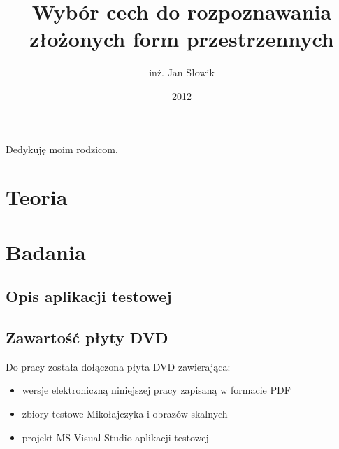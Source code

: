 \documentclass[oneside]{mgr}
\title{Wybór cech do rozpoznawania \\złożonych form przestrzennych}
\author{inż. Jan Słowik}
\date{2012}
\begin{document}
 
\maketitle 
\dedication{6cm}{Dedykuję moim rodzicom.}
\tableofcontents 


\part{Teoria}

\part{Badania}





\appendix
\chapter{Opis aplikacji testowej}
\chapter{Zawartość płyty DVD}
Do pracy została dołączona płyta DVD zawierająca:
\begin{itemize}
\item wersje elektroniczną niniejszej pracy zapisaną w formacie PDF
\item zbiory testowe Mikołajczyka i obrazów skalnych
\item projekt MS Visual Studio aplikacji testowej
\end{itemize}






 \listoffigures
 \listoftables
\end{document}
